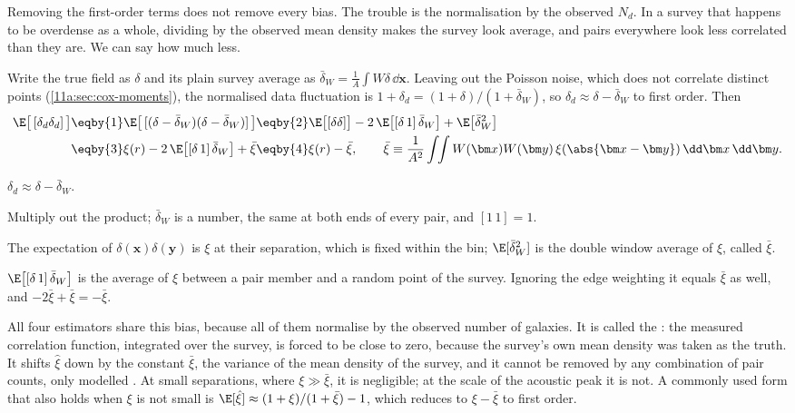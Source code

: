 Removing the first-order terms does not remove every bias. The trouble is the
normalisation by the observed $N_d$. In a survey that happens to be overdense as a
whole, dividing by the observed mean density makes the survey look average, and
pairs everywhere look less correlated than they are. We can say how much less.

Write the true field as $\delta$ and its plain survey average as
$\bar\delta_W=\frac1A\int W\delta\,\dd\bm x$. Leaving out the Poisson noise, which
does not correlate distinct points (\cref{11a:sec:cox-moments}), the normalised
data fluctuation is $1+\delta_d=(1+\delta)/(1+\bar\delta_W)$, so
$\delta_d\approx\delta-\bar\delta_W$ to first order. Then
\begin{align}
  \E\bigl[\,[\delta_d\delta_d]\,\bigr]
  &\eqby{1}\E\bigl[\,[(\delta-\bar\delta_W)(\delta-\bar\delta_W)]\,\bigr]
   \eqby{2}\E\bigl[[\delta\delta]\bigr]-2\,\E\bigl[[\delta\,1]\,\bar\delta_W\bigr]
     +\E\bigl[\bar\delta_W^2\bigr]\nonumber\\
  &\eqby{3}\xi(r)-2\,\E\bigl[[\delta\,1]\,\bar\delta_W\bigr]+\bar\xi
   \eqby{4}\xi(r)-\bar\xi,
  \qquad
  \bar\xi\equiv\frac{1}{A^2}\int\!\!\int W(\bm x)W(\bm y)\,\xi(\abs{\bm x-\bm y})\,
  \dd\bm x\,\dd\bm y . \label{11a:eq:ic}
\end{align}
\begin{explain}
  \item $\delta_d\approx\delta-\bar\delta_W$.
  \item Multiply out the product; $\bar\delta_W$ is a number, the same at both
        ends of every pair, and $[1\,1]=1$.
  \item The expectation of $\delta(\bm x)\delta(\bm y)$ is $\xi$ at their
        separation, which is fixed within the bin; $\E[\bar\delta_W^2]$ is the
        double window average of $\xi$, called $\bar\xi$.
  \item $\E\bigl[[\delta\,1]\,\bar\delta_W\bigr]$ is the average of $\xi$ between a
        pair member and a random point of the survey. Ignoring the edge weighting
        it equals $\bar\xi$ as well, and $-2\bar\xi+\bar\xi=-\bar\xi$.
\end{explain}
All four estimators share this bias, because all of them normalise by the
observed number of galaxies. It is called the : the
measured correlation function, integrated over the survey, is forced to be
close to zero, because the survey's own mean density was taken as the truth. It
shifts $\hat\xi$ down by the constant $\bar\xi$, the variance of the mean density
of the survey, and it cannot be removed by any combination of pair counts, only
modelled . At small separations,
where $\xi\gg\bar\xi$, it is negligible; at the scale of the acoustic peak it is
not. A commonly used form that also holds when $\xi$ is not small is
$\E[\hat\xi]\approx(1+\xi)/(1+\bar\xi)-1$, which reduces to $\xi-\bar\xi$ to
first order.

